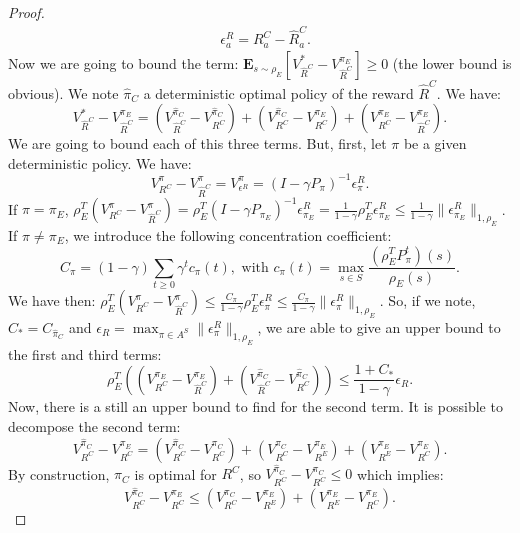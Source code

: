 \documentclass[smallextended]{svjour3}
\newcommand{\E}{\mathbf{E}}
\begin{document}
\begin{proof}
\begin{align}
&\epsilon^R_a=R^C_a-\hat{R}^C_a.
\end{align}
Now we are going to bound the term: $\E_{s\sim\rho_E}[V^*_{\hat{R}^C}-V^{\pi_E}_{\hat{R}^C}]\geq0$ (the lower bound is obvious).
We note $\hat{\pi}_C$ a deterministic optimal policy of the reward $\hat{R}^C$. We have:
\begin{equation}
V^*_{\hat{R}^C}-V^{\pi_E}_{\hat{R}^C}=(V^{\hat{\pi}_C}_{\hat{R}^C}-V^{\hat{\pi}_C}_{R^C})+(V^{\hat{\pi}_C}_{R^C}-V^{\pi_E}_{R^C})+(V^{\pi_E}_{R^C}-V^{\pi_E}_{\hat{R}^C}).
\end{equation}
We are going to bound each of this three terms. But, first, let $\pi$ be a given deterministic policy. We have:
\begin{equation}
V^{\pi}_{R^C}-V^{\pi}_{\hat{R}^C}=V^{\pi}_{\epsilon^R}=(I-\gamma P_\pi)^{-1}\epsilon^R_{\pi}.
\end{equation}
If $\pi=\pi_E$, $\rho_E^T(V^{\pi}_{R^C}-V^{\pi}_{\hat{R}^C})=\rho_E^T(I-\gamma P_{\pi_E})^{-1}\epsilon^R_{\pi_E}=\frac{1}{1-\gamma}\rho_E^T\epsilon^R_{\pi_E}\leq\frac{1}{1-\gamma}\|\epsilon^R_{\pi_E}\|_{1,\rho_E}$.
If $\pi\neq\pi_E$, we introduce the following concentration coefficient:
\begin{equation}
C_{\pi}=(1-\gamma)\sum_{t\geq0}\gamma^tc_{\pi}(t), \text{ with } c_{\pi}(t)=\max_{s\in S}\frac{(\rho_E^TP^t_\pi)(s)}{\rho_E(s)}.
\end{equation}
We have then: $\rho_E^T(V^{\pi}_{R^C}-V^{\pi}_{\hat{R}^C})\leq\frac{C_\pi}{1-\gamma}\rho_E^T\epsilon^R_{\pi}\leq\frac{C_\pi}{1-\gamma}\|\epsilon^R_{\pi}\|_{1,\rho_E}$. So, if we note, $C_*=C_{\hat{\pi}_C}$ and $\epsilon_R=\max_{\pi\in A^S}\|\epsilon_\pi^R\|_{1,\rho_E}$, we are able to give an upper bound to the first and third terms:
\begin{equation}
\rho_E^T((V^{\pi_E}_{R^C}-V^{\pi_E}_{\hat{R}^C})+(V^{\hat{\pi}_C}_{\hat{R}^C}-V^{\hat{\pi}_C}_{R^C}))\leq\frac{1+C_*}{1-\gamma}\epsilon_R.
\end{equation}
Now, there is a still an upper bound to find for the second term. It is possible to decompose the second term:
\begin{equation}
V^{\hat{\pi}_C}_{R^C}-V^{\pi_E}_{R^C}=(V^{\hat{\pi}_C}_{R^C}-V^{\pi_C}_{R^C})+(V^{\pi_C}_{R^C}-V^{\pi_E}_{R^E})+(V^{\pi_E}_{R^E}-V^{\pi_E}_{R^C}).
\end{equation}
By construction, $\pi_C$ is optimal for $R^C$, so $V^{\hat{\pi}_C}_{R^C}-V^{\pi_C}_{R^C}\leq0$ which implies:
\begin{equation}
V^{\hat{\pi}_C}_{R^C}-V^{\pi_E}_{R^C}\leq(V^{\pi_C}_{R^C}-V^{\pi_E}_{R^E})+(V^{\pi_E}_{R^E}-V^{\pi_E}_{R^C}).

\end{equation}
\end{proof}
\end{document}
